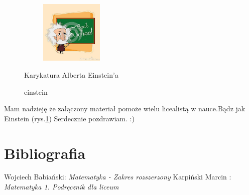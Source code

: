 \documentclass[12pt,a4paper]{article}
\begin{document}
\begin{figure}
\centering
\includegraphics[width=5cm,height=3cm]{einstein}
\caption{einstein}{Karykatura Alberta Einstein'a}
\label{fig:obrazek einstein}
\end{figure}

\center Mam nadzieję że załączony materiał pomoże wielu licealistą w nauce.Bądz jak Einstein (rys.\ref{fig:obrazek einstein})
\center Serdecznie pozdrawiam. :)




\section{Bibliografia}

\begin{thebibliography}{9}
Wojciech Babiański: \emph{Matematyka - Zakres rozszerzony}
Karpiński Marcin : \emph{Matematyka 1. Podręcznik dla liceum}

\end{thebibliography}
\end{document}
